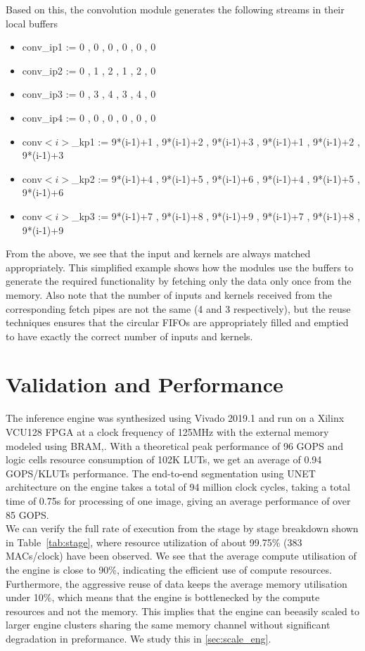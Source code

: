 \documentclass[a4paper,12pt, final]{report}
\begin{document}
Based on this, the convolution module generates the following streams in their local buffers

\begin{itemize}
	\item conv\_ip1 := 0 , 0 , 0 , 0 , 0 , 0
	\item conv\_ip2 := 0 , 1 , 2 , 1 , 2 , 0
	\item conv\_ip3 := 0 , 3 , 4 , 3 , 4 , 0
	\item conv\_ip4 := 0 , 0 , 0 , 0 , 0 , 0
	\item conv$<i>$\_kp1 := 9*(i-1)+1 , 9*(i-1)+2 , 9*(i-1)+3 , 9*(i-1)+1 , 9*(i-1)+2 , 9*(i-1)+3
	\item conv$<i>$\_kp2 := 9*(i-1)+4 , 9*(i-1)+5 , 9*(i-1)+6 , 9*(i-1)+4 , 9*(i-1)+5 , 9*(i-1)+6
	\item conv$<i>$\_kp3 := 9*(i-1)+7 , 9*(i-1)+8 , 9*(i-1)+9 , 9*(i-1)+7 , 9*(i-1)+8 , 9*(i-1)+9
\end{itemize}

From the above, we see that the input and kernels are always matched appropriately. This simplified example shows how the modules use the buffers to generate the required functionality by fetching only the data only once from the memory. Also note that the number of inputs and kernels received from the corresponding fetch pipes are not the same (4 and 3 respectively), but the reuse techniques ensures that the circular FIFOs are appropriately filled and emptied to have exactly the correct number of inputs and kernels.

\section{Validation and Performance}

The inference engine was synthesized using Vivado 2019.1 and run on a Xilinx VCU128 FPGA at a clock frequency of 125MHz with the external memory modeled using BRAM,. With a theoretical peak performance of 96 GOPS and logic cells resource consumption of 102K LUTs, we get an average of 0.94 GOPS/KLUTs performance. The end-to-end segmentation using UNET architecture on the engine takes a total of 94 million clock cycles, taking a total time of 0.75s for processing of one image, giving an average performance of over 85 GOPS.
\\

We can verify the full rate of execution from the stage by stage breakdown shown in Table~\ref{tab:stage}, where resource utilization of about 99.75\% (383 MACs/clock) have been observed. We see that the average compute utilisation of the engine is close to 90\%, indicating the efficient use of compute resources. Furthermore, the aggressive reuse of data keeps the average memory utilisation under 10\%, which means that the engine is bottlenecked by the compute resources and not the memory. This implies that the engine can beeasily scaled to larger engine clusters sharing the same memory channel without significant degradation in preformance. We study this in \ref{sec:scale_eng}. 
\\
\end{document}
